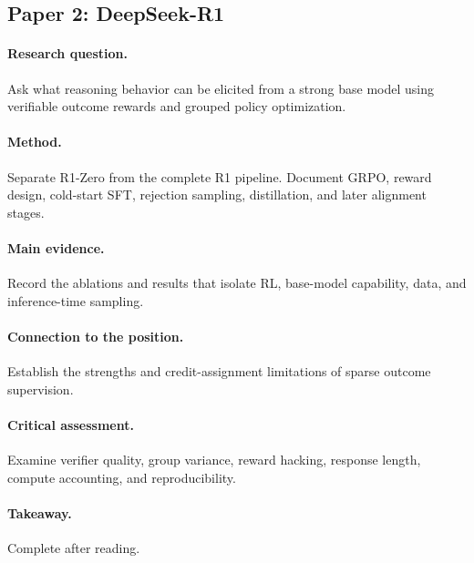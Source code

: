 \subsection{Paper 2: DeepSeek-R1 \citep{guo2025deepseekr1}}
\paragraph{Research question.} Ask what reasoning behavior can be elicited from a strong base model using verifiable outcome rewards and grouped policy optimization.
\paragraph{Method.} Separate R1-Zero from the complete R1 pipeline. Document GRPO, reward design, cold-start SFT, rejection sampling, distillation, and later alignment stages.
\paragraph{Main evidence.} Record the ablations and results that isolate RL, base-model capability, data, and inference-time sampling.
\paragraph{Connection to the position.} Establish the strengths and credit-assignment limitations of sparse outcome supervision.
\paragraph{Critical assessment.} Examine verifier quality, group variance, reward hacking, response length, compute accounting, and reproducibility.
\paragraph{Takeaway.} Complete after reading.
